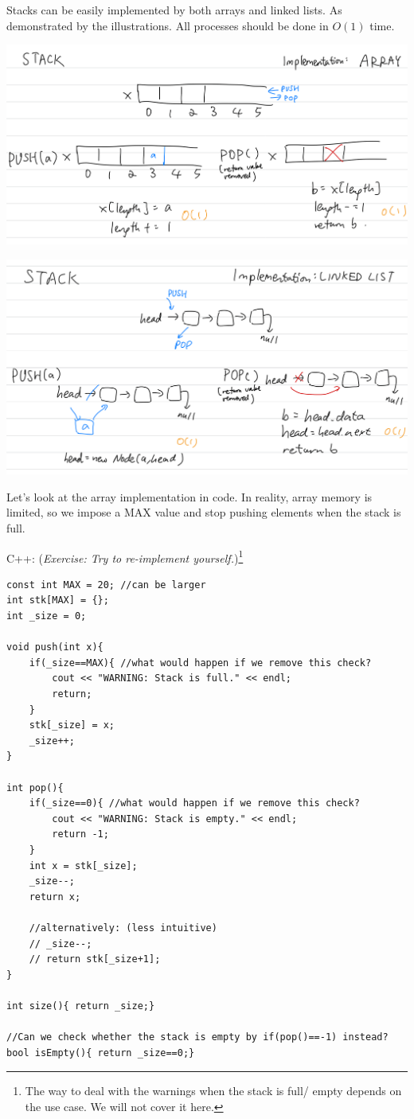 Stacks can be easily implemented by both arrays and linked lists. As demonstrated by the illustrations. All processes should be done in $O(1)$ time.

\includegraphics[width=15cm]{images/ch6-stackarray.png}

\includegraphics[width=15cm]{images/ch6-stacklinkedlist.png}

Let's look at the array implementation in code. In reality, array memory is limited, so we impose a MAX value and stop pushing elements when the stack is full.
\vspace{6mm}

C++: (\textit{Exercise: Try to re-implement yourself.})\footnote{The way to deal with the warnings when the stack is full/ empty depends on the use case. We will not cover it here.}
\begin{lstlisting}
const int MAX = 20; //can be larger
int stk[MAX] = {};
int _size = 0;

void push(int x){
    if(_size==MAX){ //what would happen if we remove this check?
        cout << "WARNING: Stack is full." << endl;
        return;
    }
    stk[_size] = x;
    _size++;
}

int pop(){
    if(_size==0){ //what would happen if we remove this check?
        cout << "WARNING: Stack is empty." << endl;
        return -1;
    }
    int x = stk[_size];
    _size--;
    return x;

    //alternatively: (less intuitive)
    // _size--;
    // return stk[_size+1];
}

int size(){ return _size;}

//Can we check whether the stack is empty by if(pop()==-1) instead?
bool isEmpty(){ return _size==0;}
\end{lstlisting}

